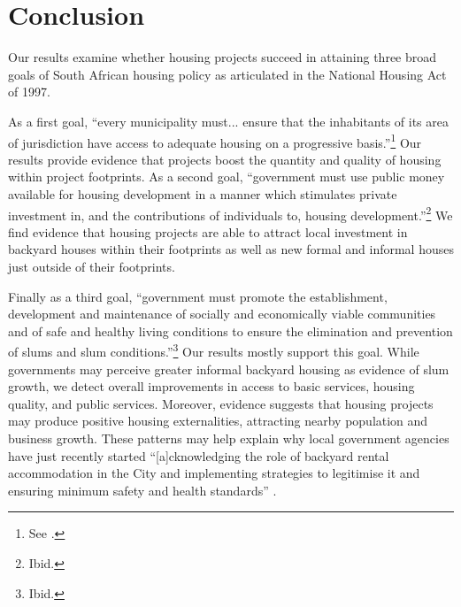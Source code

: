 \documentclass[12pt]{article}
\newcommand{\rv}{}
\begin{document}


\section{Conclusion}\label{section:conclusion}


Our results \rv{examine} whether housing projects succeed in attaining three broad goals of South African housing policy as articulated in the National Housing Act of 1997.

As a first goal, ``every municipality must... ensure that the inhabitants of its area of jurisdiction have access to adequate housing on a progressive basis.''\footnote{See \cite{housingact}.}  Our results provide evidence that projects boost the quantity and quality of housing within project footprints.  As a second goal, ``government must use public money available for housing development in a manner which stimulates private investment in, and the contributions of individuals to, housing development.''\footnote{Ibid.}    We find evidence that housing projects are able to attract local investment in backyard houses within their footprints as well as new formal and informal houses just outside of their footprints.  


Finally as a third goal, ``government must promote the establishment, development and maintenance of socially and economically viable communities and of safe and healthy living conditions to ensure the elimination and prevention of slums and slum conditions.''\footnote{Ibid.}  Our results mostly support this goal.  While governments may perceive greater informal backyard housing as evidence of slum growth, we detect overall improvements in access to basic services, housing quality, and public services.  Moreover, evidence suggests that housing projects \rv{may produce positive housing externalities}, attracting nearby population and business growth.  These patterns may help explain why local government agencies have just recently started ``[a]cknowledging the role of backyard rental accommodation in the City and implementing strategies to legitimise it and ensuring minimum safety and health standards'' \citep{sdf}.
\end{document}
